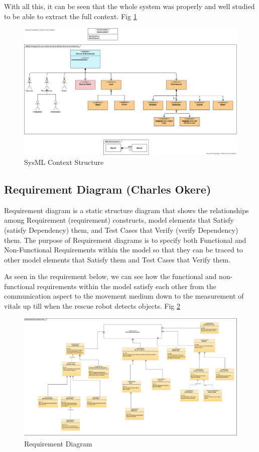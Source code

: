 \documentclass[10pt,journal,compsoc]{IEEEtran}
\begin{document}
With all this, it can be seen that the whole system was properly and well studied to be able to extract the full context. Fig \ref{fig:structure}

\begin{figure}[h]
\includegraphics[scale=0.18]{ContextStructure}
\caption{SysML Context Structure}
\label{fig:structure}
\end{figure}

\subsection{Requirement Diagram (Charles Okere)}

Requirement diagram is a static structure diagram that shows the relationships among Requirement (requirement) constructs, model elements that Satisfy (satisfy Dependency) them, and Test Cases that Verify (verify Dependency) them. The purpose of Requirement diagrams is to specify both Functional and Non-Functional Requirements within the model so that they can be traced to other model elements that Satisfy them and Test Cases that Verify them.

As seen in the requirement below, we can see how the functional and non-functional requirements within the model satisfy each other from the  communication aspect to the movement medium down to the measurement of vitals up till when the rescue robot detects objects. Fig \ref{fig:requirements}


\begin{figure}[h]
\includegraphics[scale=0.145]{Requirements}
\caption{Requirement Diagram}
\label{fig:requirements}
\end{figure}
\end{document}
